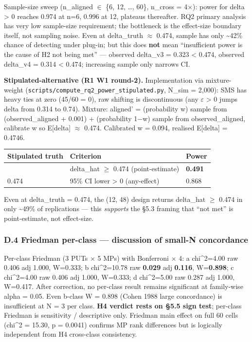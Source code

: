 \documentclass[review,12pt,authoryear]{elsarticle}
\newcounter{none}                   %
\begin{document}
Sample-size sweep (n\_aligned $\in$ \{6, 12, \ldots, 60\}, n\_cross = 4$\times$):
power for delta \textgreater{} 0 reaches 0.974 at n=6, 0.996 at 12,
plateaus thereafter. RQ2 primary analysis has very low sample-size
requirement; the bottleneck is the effect-size boundary itself, not
sampling noise. Even at delta\_truth $\approx$ 0.474, sample has only
\textasciitilde42\% chance of detecting under plug-in; but this does
\textbf{not} mean ``insufficient power is the cause of H2 not being
met'' --- observed delta\_v3 = 0.323 \textless{} 0.474, observed
delta\_v4 = 0.314 \textless{} 0.474; increasing sample only narrows CI.

\textbf{Stipulated-alternative (R1 W1 round-2).} Implementation via
mixture-weight (\texttt{scripts/compute\_rq2\_power\_stipulated.py},
N\_sim = 2,000): SMS has heavy ties at zero (45/60 = 0), raw shifting is
discontinuous (any $\varepsilon$ \textgreater{} 0 jumps delta from 0.314 to 0.74).
Mixture: aligned' = (probability w) sample from (observed\_aligned +
0.001) + (probability 1−w) sample from observed\_aligned, calibrate w so
E{[}delta{]} $\approx$ 0.474. Calibrated w = 0.094, realised E{[}delta{]} =
0.4746.

{\def\LTcaptype{none} %
\begin{longtable}[]{@{}lll@{}}
\toprule\noalign{}
Stipulated truth & Criterion & Power \\
\midrule\noalign{}
\endhead
\bottomrule\noalign{}
\endlastfoot
0.474 & delta\_hat $\geq$ 0.474 (point-estimate) & \textbf{0.491} \\
0.474 & 95\% CI lower \textgreater{} 0 (any-effect) & 0.868 \\
\end{longtable}
}

Even at delta\_truth = 0.474, the (12, 48) design returns delta\_hat $\geq$
0.474 in only \textasciitilde49\% of replications --- this
\emph{supports} the §5.3 framing that ``not met'' is point-estimate, not
effect-size.

\subsubsection{D.4 Friedman per-class --- discussion of small-N
concordance}\label{d.4-friedman-per-class-discussion-of-small-n-concordance}

Per-class Friedman (3 PUTs $\times$ 5 MPs) with Bonferroni $\times$ 4: a chi\^{}2=4.00
raw 0.406 adj 1.000, W=0.333; b chi\^{}2=10.78 raw \textbf{0.029} adj
\textbf{0.116}, W=\textbf{0.898}; c chi\^{}2=4.00 raw 0.406 adj 1.000,
W=0.333; d chi\^{}2=5.00 raw 0.287 adj 1.000, W=0.417. After correction,
no per-class result remains significant at family-wise alpha = 0.05.
Even b-class W = 0.898 (Cohen 1988 large concordance) is insufficient at
N = 3 per class. \textbf{H4 verdict rests on §5.5 sign test}; per-class
Friedman is sensitivity / descriptive only. Friedman main effect on full
60 cells (chi\^{}2 = 15.30, p = 0.0041) confirms MP rank differences but
is logically independent from H4 cross-class consistency.
\end{document}
